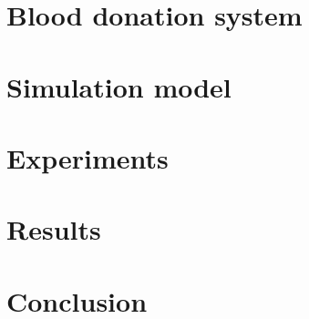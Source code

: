 \documentclass[a4paper,12pt]{article}
\begin{document}
\bigbreak


\section*{Blood donation system}

\section*{Simulation model}

\section*{Experiments}

\section*{Results}

\section*{Conclusion}

\newpage



\end{document}
